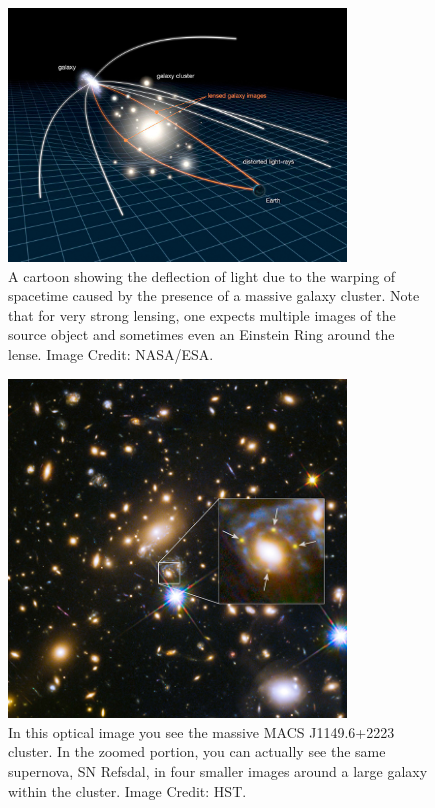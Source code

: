 \begin{figure}[t]
	\centering
	\includegraphics[width=0.8\textwidth]{gravitation_lensing_cartoon}
	\caption{A cartoon showing the deflection of light due to the warping of spacetime caused by the presence of a massive galaxy cluster.  Note that for very strong lensing, one expects multiple images of the source object and sometimes even an Einstein Ring around the lense. Image Credit: NASA/ESA.}
	\label{fig:gravitation_lensing_cartoon}
\end{figure}

\begin{figure}[t]
	\centering
	\includegraphics[width=0.8\textwidth]{einstein_cross}
	\caption{In this optical image you see the massive MACS J1149.6+2223 cluster.  In the zoomed portion, you can actually see the same supernova, SN Refsdal, in four smaller images around a large galaxy within the cluster. Image Credit: HST.}
	\label{fig:einstein_cross}
\end{figure}



